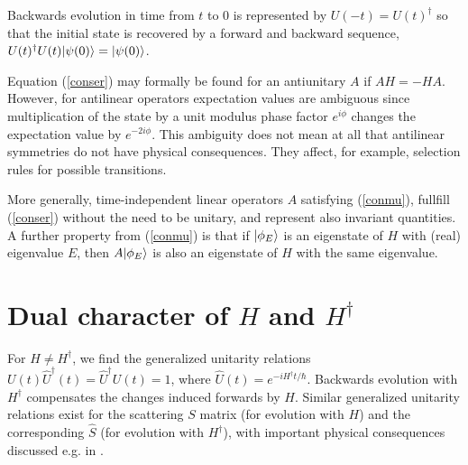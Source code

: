 Backwards evolution in time from $t$ to 0 is
represented by $U(-t)=U(t)^\dagger$ so that the initial state is recovered by
a forward and backward sequence,
$U(t)^{\dagger}U(t)|\psi(0)\rangle=|\psi(0)\rangle$.

Equation (\ref{conser}) may formally be found for an antiunitary $A$ if $AH = -HA$. However,
for antilinear operators expectation  values are ambiguous since multiplication of the state by a
unit modulus phase factor $e^{i\phi}$ changes the expectation value by $e^{-2i\phi}$.
This ambiguity
does not mean at all that antilinear symmetries do not have physical consequences.
They affect, for example, selection rules for possible transitions.


More generally, time-independent linear operators $A$ satisfying (\ref{conmu}), fullfill (\ref{conser}) without the
need to be unitary,
and represent also invariant quantities.
A further property from (\ref{conmu}) is that if $|\phi_E\rangle$ is an eigenstate of $H$ with (real) eigenvalue $E$, then
$A|\phi_E\rangle$ is also an eigenstate of $H$ with the same eigenvalue.
%
%
%
\section{Dual character of $H$ and $H^\dagger$}
%
%
%
For $H\neq H^\dagger$,
we find the generalized unitarity relations
$U(t)\widehat{U}^\dagger(t)=\widehat{U}^\dagger U(t)=1$, where $\widehat{U}(t)=e^{-iH^\dagger t/\hbar}$.
Backwards evolution with $H^\dagger$
compensates the changes induced forwards by $H$. Similar generalized unitarity relations exist for the scattering
$S$ matrix (for evolution with $H$) and the corresponding $\widehat{S}$ (for evolution with $H^\dagger$), with
important physical consequences discussed e.g. in \cite{Muga2004,Ruschhaupt2017}.
%

